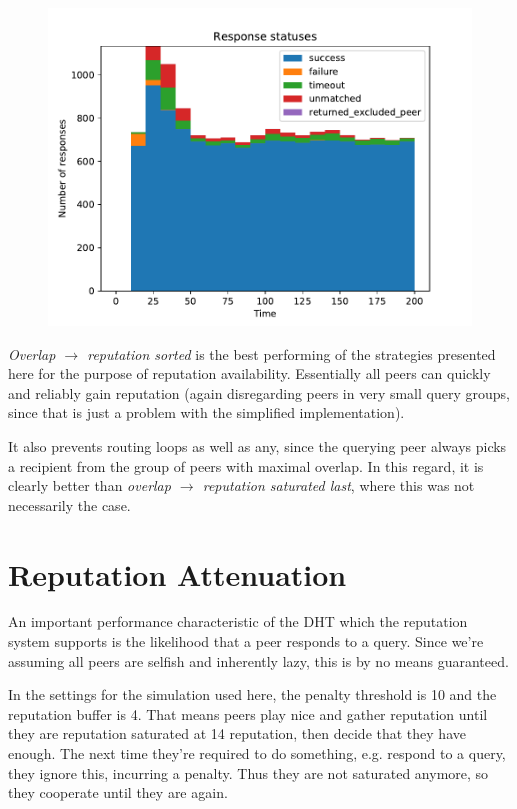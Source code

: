 \begin{figure}[t]
\centering
\includegraphics[width=1\columnwidth]{figures/selection_overlap_rep_sorted_resp_statuses}
\label{fig:selection_overlap_rep_sorted_resp_statuses}
\end{figure}

\emph{Overlap $\rightarrow$ reputation sorted} is the best performing of the
strategies presented here for the purpose of reputation availability.
Essentially all peers can quickly and reliably gain reputation (again
disregarding peers in very small query groups, since that is just a problem with
the simplified implementation).

It also prevents routing loops as well as any, since the querying peer always
picks a recipient from the group of peers with maximal overlap. In this regard,
it is clearly better than \emph{overlap $\rightarrow$ reputation saturated
last}, where this was not necessarily the case.

\section{Reputation Attenuation}
\label{sec:attenuation}
An important performance characteristic of the DHT which the reputation system
supports is the likelihood that a peer responds to a query. Since we're assuming
all peers are selfish and inherently lazy, this is by no means guaranteed.

In the settings for the simulation used here, the penalty threshold is 10 and
the reputation buffer is 4. That means peers play nice and gather reputation
until they are reputation saturated at 14 reputation, then decide that they have
enough. The next time they're required to do something, e.g. respond to a query,
they ignore this, incurring a penalty. Thus they are not saturated anymore, so
they cooperate until they are again.

